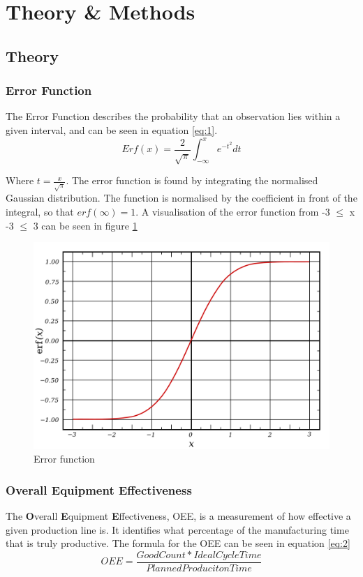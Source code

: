 \section{Theory \& Methods}

\subsection{Theory}

\subsubsection{Error Function}
The Error Function describes the probability that an observation lies within
a given interval, and can be seen in equation \ref{eq:1}.
\begin{equation} \label{eq:1}
    Erf(x)=\frac{2}{\sqrt{\pi}} \int_{-\infty}^x e^{-t^2} dt
\end{equation}

Where \(t=\frac{x}{\sqrt{\pi}}\). The error function is found by integrating
the normalised Gaussian distribution. The function is normalised by the
coefficient in front of the integral, so that \(erf(\infty) = 1\).
A visualisation of the error function from -3 $\leq$ x -3 $\leq$ 3 can be seen
in figure \ref{figure:error_function}

\begin{figure}[ht]
    \centering
    \includegraphics[scale=0.3]{images/error_function.png}
    \caption{Error function}
    \label{figure:error_function}
\end{figure}

\subsubsection{Overall Equipment Effectiveness}
The \textbf{O}verall \textbf{E}quipment \textbf{E}ffectiveness, OEE, is a
measurement of how effective a given production line is. It identifies what
percentage of the manufacturing time that is truly productive. The formula for
the OEE can be seen in equation \ref{eq:2}
\begin{equation} \label{eq:2}
    OEE = \frac{Good Count * Ideal Cycle Time}{Planned Produciton Time}
\end{equation}

